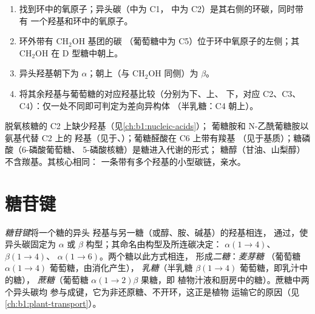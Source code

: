 \begin{method}[读懂哈沃斯投影]\label{met:b1:carbohydrates:haworth}
\begin{enumerate}
  \item 找到环中的氧原子；异头碳（中为 C1，
        中为 C2）是其右侧的环碳，同时带有
        一个羟基和环中的氧原子。
  \item 环外带有 $\mathrm{CH_2OH}$ 基团的碳
        （葡萄糖中为 C5）位于环中氧原子的左侧；其
        $\mathrm{CH_2OH}$ 在 D 型糖中朝上。
  \item 异头羟基朝下为 $\alpha$；朝上（与
        $\mathrm{CH_2OH}$ 同侧）为 $\beta$。
  \item 将其余羟基与葡萄糖的对应羟基比较（分别为下、上、
        下，对应 C2、C3、C4）：仅一处不同即可判定为差向异构体
        （半乳糖：C4 朝上）。
\end{enumerate}
\end{method}

\begin{example}[不是 $(\mathrm{CH_2O})_n$ 的糖]\label{ex:b1:carbohydrates:derivatives}
脱氧核糖的 C2 上缺少羟基（见\cref{ch:b1:nucleic-acids}）；
葡糖胺和 N-乙酰葡糖胺以氨基代替 C2 上的
羟基（见于、）；葡糖醛酸在 C6 上带有羧基
（见于基质）；糖磷酸（6-磷酸葡萄糖、
5-磷酸核糖）是糖进入代谢的形式；
糖醇（甘油、山梨醇）不含羰基。其核心相同：
一条带有多个羟基的小型碳链，亲水。
\end{example}

\section{糖苷键}

\begin{definition}[糖苷键，二糖]\label{def:b1:carbohydrates:glycosidic}
\emph{糖苷键}将一个糖的异头
羟基与另一糖（或醇、胺、碱基）的羟基相连，
通过，使异头碳固定为
$\alpha$ 或 $\beta$ 构型；其命名由构型及所连碳决定：
$\alpha(1{\to}4)$、$\beta(1{\to}4)$、
$\alpha(1{\to}6)$。两个糖以此方式相连，
形成\emph{二糖}：\emph{麦芽糖}
（葡萄糖 $\alpha(1{\to}4)$ 葡萄糖，由消化产生），
\emph{乳糖}（半乳糖 $\beta(1{\to}4)$ 葡萄糖，即乳汁中的糖），
\emph{蔗糖}（葡萄糖 $\alpha(1{\to}2)\beta$ 果糖，即
植物汁液和厨房中的糖）。蔗糖中两个异头碳均
参与成键，它为非还原糖、不开环，这正是植物
运输它的原因（见\cref{ch:b1:plant-transport}）。
\end{definition}

